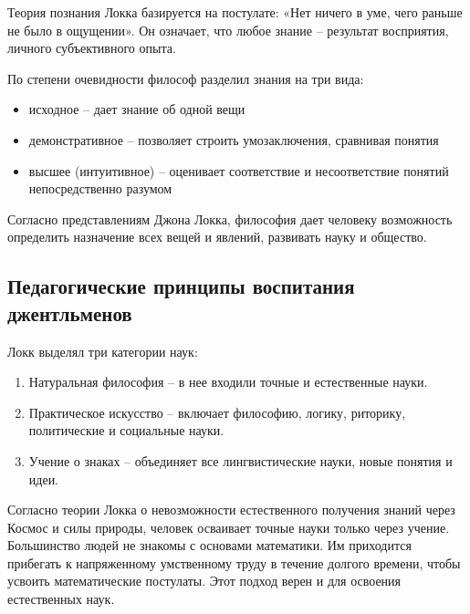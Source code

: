 \documentclass[
]{article}
\providecommand{\tightlist}{%
  \setlength{\itemsep}{0pt}\setlength{\parskip}{0pt}}
\begin{document}
Теория познания Локка базируется на постулате: «Нет ничего в уме, чего
раньше не было в ощущении». Он означает, что любое знание -- результат
восприятия, личного субъективного опыта.

По степени очевидности философ разделил знания на три вида:

\begin{itemize}
\tightlist
\item
  исходное -- дает знание об одной вещи
\item
  демонстративное -- позволяет строить умозаключения, сравнивая понятия
\item
  высшее (интуитивное) -- оценивает соответствие и несоответствие
  понятий непосредственно разумом
\end{itemize}

Согласно представлениям Джона Локка, философия дает человеку возможность
определить назначение всех вещей и явлений, развивать науку и общество.

\hypertarget{ux43fux435ux434ux430ux433ux43eux433ux438ux447ux435ux441ux43aux438ux435-ux43fux440ux438ux43dux446ux438ux43fux44b-ux432ux43eux441ux43fux438ux442ux430ux43dux438ux44f-ux434ux436ux435ux43dux442ux43bux44cux43cux435ux43dux43eux432}{%
\subsection{Педагогические принципы воспитания
джентльменов}\label{ux43fux435ux434ux430ux433ux43eux433ux438ux447ux435ux441ux43aux438ux435-ux43fux440ux438ux43dux446ux438ux43fux44b-ux432ux43eux441ux43fux438ux442ux430ux43dux438ux44f-ux434ux436ux435ux43dux442ux43bux44cux43cux435ux43dux43eux432}}

Локк выделял три категории наук:

\begin{enumerate}
\def\labelenumi{\arabic{enumi}.}
\tightlist
\item
  Натуральная философия -- в нее входили точные и естественные науки.
\item
  Практическое искусство -- включает философию, логику, риторику,
  политические и социальные науки.
\item
  Учение о знаках -- объединяет все лингвистические науки, новые понятия
  и идеи.
\end{enumerate}

Согласно теории Локка о невозможности естественного получения знаний
через Космос и силы природы, человек осваивает точные науки только через
учение. Большинство людей не знакомы с основами математики. Им
приходится прибегать к напряженному умственному труду в течение долгого
времени, чтобы усвоить математические постулаты. Этот подход верен и для
освоения естественных наук.
\end{document}
